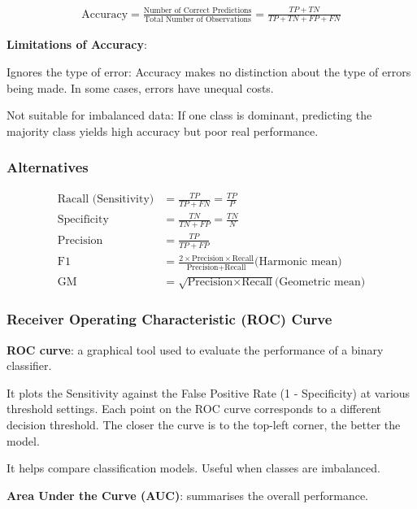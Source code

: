 \begin{align*}
    \text{Accuracy} = \frac{\text{Number of Correct Predictions}}{\text{Total Number of Observations}} = \frac{TP+TN}{TP+TN+FP+FN}
\end{align*}

\noindent\textbf{Limitations of Accuracy}:

Ignores the type of error: Accuracy makes no distinction about the type of errors being made. In some cases, errors have unequal costs.

Not suitable for imbalanced data: If one class is dominant, predicting the majority class yields high accuracy but poor real performance.

\subsubsection{Alternatives}

\begin{align*}
    \text{Racall (Sensitivity)} & = \frac{TP}{TP+FN} = \frac{TP}{P}\\
    \text{Specificity} & = \frac{TN}{TN+FP} = \frac{TN}{N}\\
    \text{Precision} & =\frac{TP}{TP+FP}\\
    \text{F1} & = \frac{2\times\text{Precision}\times\text{Recall}}{\text{Precision}+\text{Recall}}\text{(Harmonic mean)}\\
    \text{GM} & =\sqrt{\text{Precision} \times \text{Recall}}\text{(Geometric mean)}
\end{align*}

\subsubsection{Receiver Operating Characteristic (ROC) Curve}

\indent 

\noindent\textbf{ROC curve}: a graphical tool used to evaluate the performance of a binary classifier.

It plots the Sensitivity against the False Positive Rate (1 - Specificity) at various threshold settings. Each point on the ROC curve corresponds to a different decision threshold. The closer the curve is to the top-left corner, the better the model.

It helps compare classification models. Useful when classes are imbalanced.

\noindent \textbf{Area Under the Curve (AUC)}: summarises the overall performance.

